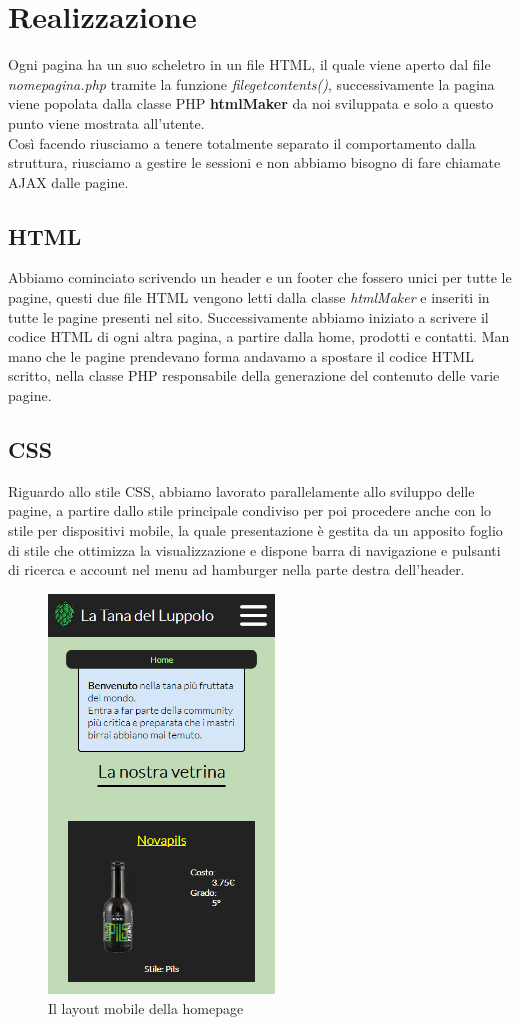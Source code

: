 \section{Realizzazione}
Ogni pagina ha un suo scheletro in un file HTML, il quale viene aperto dal file \textit{nome\textunderscore pagina.php} tramite la funzione \textit{file\textunderscore get\textunderscore contents()}, successivamente la pagina viene popolata dalla classe PHP \textbf{htmlMaker} da noi sviluppata e solo a questo punto viene mostrata all'utente.\\
Così facendo riusciamo a tenere totalmente separato il comportamento dalla struttura, riusciamo a gestire le sessioni e non abbiamo bisogno di fare chiamate AJAX dalle pagine.
\subsection{HTML}
Abbiamo cominciato scrivendo un header e un footer che fossero unici per tutte le pagine, questi due file HTML vengono letti dalla classe \textit{htmlMaker} e inseriti in tutte le pagine presenti nel sito. Successivamente abbiamo iniziato a scrivere il codice HTML di ogni altra pagina, a partire dalla home, prodotti e contatti. Man mano che le pagine prendevano forma andavamo a spostare il codice HTML scritto, nella classe PHP responsabile della generazione del contenuto delle varie pagine.
\subsection{CSS}
Riguardo allo stile CSS, abbiamo lavorato parallelamente allo sviluppo delle pagine, a partire dallo stile principale condiviso per poi procedere anche con lo stile per dispositivi mobile, la quale presentazione è gestita da un apposito foglio di stile che ottimizza la visualizzazione e dispone barra di navigazione e pulsanti di ricerca e account nel menu ad hamburger nella parte destra dell'header.


\begin{figure}[H]
	\centering
	\includegraphics[width=6cm]{utility/home_mobile.png}
	\caption{Il layout mobile della homepage}
\end{figure}

